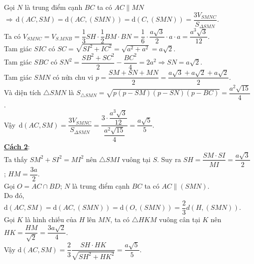 \begin{ex}
{		Gọi $N$ là trung điểm cạnh $BC$ ta có $AC \parallel MN$ \\
		$ \Rightarrow \mathrm{\,d}(AC,SM)=\mathrm{d}(AC,(SMN))=\mathrm{d}(C,(SMN))=\dfrac{3V_{SMNC}}{S_{\Delta SMN}}$. \\
		Ta có $V_{SMNC}=V_{S.MNB}=\dfrac{1}{3}SH\cdot\dfrac{1}{2}BM\cdot BN=\dfrac{1}{6}\cdot\dfrac{a\sqrt{3}}{2}\cdot a\cdot a=\dfrac{a^3\sqrt{3}}{12}$. \\
		Tam giác $SIC$ có $SC=\sqrt{SI^2+IC^2}=\sqrt{a^2+a^2}=a\sqrt{2}$. \\
		Tam giác $SBC$ có $SN^2=\dfrac{SB^2+SC^2}{2}-\dfrac{BC^2}{4}=2a^2 \Rightarrow SN=a\sqrt{2}$. \\
		Tam giác $SMN$ có nửa chu vi $p=\dfrac{SM+SN+MN}{2}=\dfrac{a\sqrt{3}+a\sqrt{2}+a\sqrt{2}}{2}$. \\
		Và diện tích $\triangle SMN$ là $S_{\triangle SMN}=\sqrt{p(p-SM)(p-SN)(p-BC)}=\dfrac{a^2\sqrt{15}}{4}$. \\
		Vậy $\mathrm{\,d}(AC,SM)=\dfrac{3V_{SMNC}}{S_{\Delta SMN}}=\dfrac{3\cdot \dfrac{a^3\sqrt{3}}{12}}{\dfrac{a^2\sqrt{15}}{4}}=\dfrac{a\sqrt{5}}{5}$. \\
		\textbf{\underline{Cách 2}}: \\
		Ta thấy $SM^2+SI^2=MI^2$ nên $\triangle SMI$ vuông tại $S$. Suy ra $SH=\dfrac{SM\cdot SI}{MI}=\dfrac{a\sqrt{3}}{2}$; $HM=\dfrac{3a}{2}$. \\
		Gọi $O=AC\cap BD$; $N$ là trung điểm cạnh $BC$ ta có $AC \parallel (SMN)$. \\
		Do đó, $\mathrm{d}(AC,SM)=\mathrm{d}(AC,(SMN))=\mathrm{d}(O,(SMN))=\dfrac{2}{3}d\left(H,(SMN)\right)$. \\
		Gọi $K$ là hình chiếu của $H$ lên $MN$, ta có $\triangle HKM$ vuông cân tại $K$ nên $HK=\dfrac{HM}{\sqrt{2}}=\dfrac{3a\sqrt{2}}{4}$. \\
		Vậy $\mathrm{d}(AC,SM)=\dfrac{2}{3}\dfrac{SH\cdot HK}{\sqrt{SH^2+HK^2}}=\dfrac{a\sqrt{5}}{5}$.}
\end{ex}

